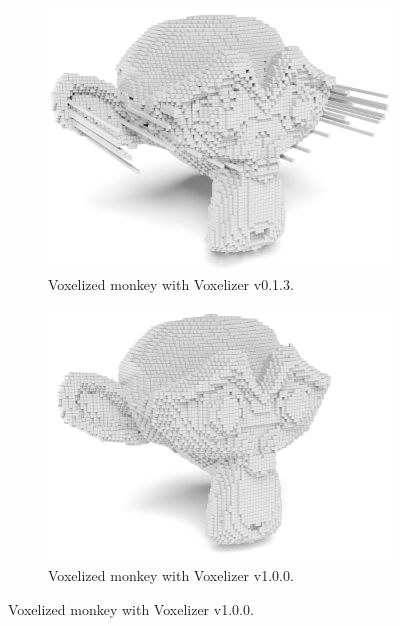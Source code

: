 \begin{figure}[hp]
    \centering
    \begin{subfigure}[b]{0.48\textwidth}
        \centering
        \includegraphics[width=\textwidth]{sections/theory/figures/voxelizer-v013-monkey-100.png}
        \caption{Voxelized monkey with Voxelizer v0.1.3.}
        \label{fig:result-voxelizer-v0.1.3-monkey}
    \end{subfigure}
    \hfill
    \begin{subfigure}[b]{0.50\textwidth}
        \centering
        \includegraphics[width=\textwidth]{sections/result/figures/monkey-voxelized-v1-100.png}
        \caption{Voxelized monkey with Voxelizer v1.0.0.}
        \label{fig:result-voxelizer-v1-monkey}

\end{subfigure}
\end{figure}

